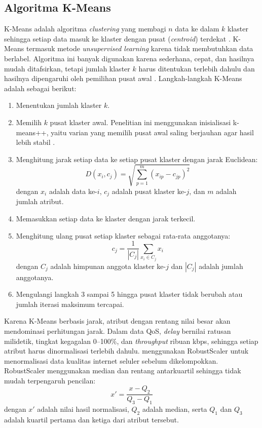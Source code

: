 \subsection{Algoritma K-Means}
\label{subsec:kmeans}
K-Means adalah algoritma \textit{clustering} yang membagi $n$ data ke dalam $k$ klaster sehingga setiap data masuk ke klaster dengan pusat (\textit{centroid}) terdekat \parencite{ikotun2023kmeans}. K-Means termasuk metode \textit{unsupervised learning} karena tidak membutuhkan data berlabel. Algoritma ini banyak digunakan karena sederhana, cepat, dan hasilnya mudah ditafsirkan, tetapi jumlah klaster $k$ harus ditentukan terlebih dahulu dan hasilnya dipengaruhi oleh pemilihan pusat awal \parencite{ikotun2023kmeans}. Langkah-langkah K-Means adalah sebagai berikut:
\begin{enumerate}
    \item Menentukan jumlah klaster $k$.
    \item Memilih $k$ pusat klaster awal. Penelitian ini menggunakan inisialisasi k-means++, yaitu varian yang memilih pusat awal saling berjauhan agar hasil lebih stabil \parencite{ikotun2023kmeans}.
    \item Menghitung jarak setiap data ke setiap pusat klaster dengan jarak Euclidean:
    \begin{equation}
    D(x_i, c_j) = \sqrt{\sum_{p=1}^{m} \left(x_{ip} - c_{jp}\right)^2}
    \label{eq:euclidean}
    \end{equation}
    dengan $x_i$ adalah data ke-$i$, $c_j$ adalah pusat klaster ke-$j$, dan $m$ adalah jumlah atribut.
    \item Memasukkan setiap data ke klaster dengan jarak terkecil.
    \item Menghitung ulang pusat setiap klaster sebagai rata-rata anggotanya:
    \begin{equation}
    c_j = \frac{1}{\left|C_j\right|}\sum_{x_i \in C_j} x_i
    \label{eq:centroid}
    \end{equation}
    dengan $C_j$ adalah himpunan anggota klaster ke-$j$ dan $\left|C_j\right|$ adalah jumlah anggotanya.
    \item Mengulangi langkah 3 sampai 5 hingga pusat klaster tidak berubah atau jumlah iterasi maksimum tercapai.
\end{enumerate}

Karena K-Means berbasis jarak, atribut dengan rentang nilai besar akan mendominasi perhitungan jarak. Dalam data QoS, \textit{delay} bernilai ratusan milidetik, tingkat kegagalan 0--100\%, dan \textit{throughput} ribuan kbps, sehingga setiap atribut harus dinormalisasi terlebih dahulu. \textcite{irwansyah2025kmeans} menggunakan RobustScaler untuk menormalisasi data kualitas internet seluler sebelum dikelompokkan. RobustScaler menggunakan median dan rentang antarkuartil sehingga tidak mudah terpengaruh pencilan:
\begin{equation}
x' = \frac{x - Q_2}{Q_3 - Q_1}
\label{eq:robust}
\end{equation}
dengan $x'$ adalah nilai hasil normalisasi, $Q_2$ adalah median, serta $Q_1$ dan $Q_3$ adalah kuartil pertama dan ketiga dari atribut tersebut.

